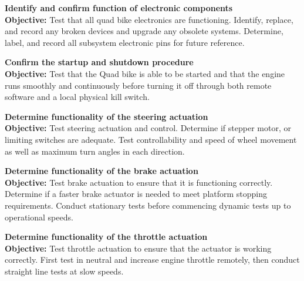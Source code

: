 \documentclass[main.tex]{subfiles}
\begin{document}
\begin{appendices}
\begin{qb}
\textbf{Identify and confirm function of electronic components}\\
\textbf{Objective:} Test that all quad bike electronics are functioning. Identify, replace, and record any broken devices and upgrade any obsolete systems. Determine, label, and record all subsystem electronic pins for future reference.

\end{qb}

\begin{qb}
\textbf{Confirm the startup and shutdown procedure}\\
\textbf{Objective:} Test that the Quad bike is able to be started and that the engine runs smoothly and continuously before turning it off through both remote software and a local physical kill switch.

\end{qb}

\begin{qb}
\textbf{Determine functionality of the steering actuation}\\
\textbf{Objective:} Test steering actuation and control. Determine if stepper motor, or limiting switches are adequate. Test controllability and speed of wheel movement as well as maximum turn angles in each direction.

\end{qb}

\begin{qb}
\textbf{Determine functionality of the brake actuation}\\
\textbf{Objective:} Test brake actuation to ensure that it is functioning correctly. Determine if a faster brake actuator is needed to meet platform stopping requirements. Conduct stationary tests before commencing dynamic tests up to operational speeds.

\end{qb}

\begin{qb}
\textbf{Determine functionality of the throttle actuation}\\
\textbf{Objective:} Test throttle actuation to ensure that the actuator is working correctly. First test in neutral and increase engine throttle remotely, then conduct straight line tests at slow speeds.

\end{qb}


\end{appendices}
\end{document}
